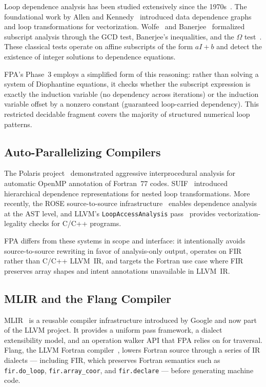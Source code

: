\documentclass[conference]{IEEEtran}
\begin{document}
Loop dependence analysis has been studied extensively since the
1970s~\cite{allen1987automatic}.  The foundational work by Allen and
Kennedy~\cite{allen1987automatic} introduced data dependence graphs and
loop transformations for vectorization.  Wolfe~\cite{wolfe1996high}
and Banerjee~\cite{banerjee1988dependence} formalized subscript
analysis through the GCD test, Banerjee's inequalities, and the
$\Omega$ test~\cite{pugh1992omega}.  These classical tests operate on
affine subscripts of the form $aI + b$ and detect the existence of
integer solutions to dependence equations.

FPA's Phase~3 employs a simplified form of this reasoning: rather than
solving a system of Diophantine equations, it checks whether the
subscript expression is exactly the induction variable (no dependency
across iterations) or the induction variable offset by a nonzero
constant (guaranteed loop-carried dependency).  This restricted
decidable fragment covers the majority of structured numerical loop
patterns.

\subsection{Auto-Parallelizing Compilers}

The Polaris project~\cite{blume1994polaris} demonstrated aggressive
interprocedural analysis for automatic OpenMP annotation of Fortran~77
codes.  SUIF~\cite{hall1996maximizing} introduced hierarchical
dependence representations for nested loop transformations.
More recently, the ROSE source-to-source infrastructure~\cite{quinlan2000rose}
enables dependence analysis at the AST level, and LLVM's
\texttt{LoopAccessAnalysis} pass~\cite{llvm} provides
vectorization-legality checks for C/C++ programs.

FPA differs from these systems in scope and interface: it intentionally
avoids source-to-source rewriting in favor of analysis-only output,
operates on FIR rather than C/C++ LLVM~IR, and targets the Fortran
use case where FIR preserves array shapes and intent annotations
unavailable in LLVM~IR.

\subsection{MLIR and the Flang Compiler}

MLIR~\cite{lattner2021mlir} is a reusable compiler infrastructure
introduced by Google and now part of the LLVM project.  It provides a
uniform pass framework, a dialect extensibility model, and an
operation walker API that FPA relies on for traversal.  Flang, the
LLVM Fortran compiler~\cite{flang}, lowers Fortran source through
a series of IR dialects — including FIR, which preserves Fortran
semantics such as \texttt{fir.do\_loop}, \texttt{fir.array\_coor}, and
\texttt{fir.declare} — before generating machine code.
\end{document}
